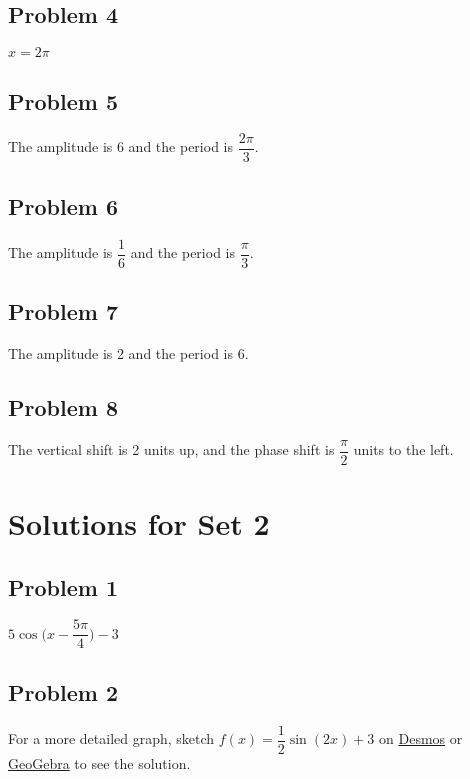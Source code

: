 \documentclass[12pt]{article}
\begin{document}
\subsection*{Problem 4}
\(x=2\pi\)
\subsection*{Problem 5}
The amplitude is 6 and the period is \(\dfrac{2\pi}{3}\).
\subsection*{Problem 6}
The amplitude is \(\dfrac{1}{6}\) and the period is \(\dfrac{\pi}{3}\).
\subsection*{Problem 7}
The amplitude is 2 and the period is 6.
\subsection*{Problem 8}
The vertical shift is 2 units up, and the phase shift is \(\dfrac{\pi}{2}\) units to the left.

\section*{Solutions for Set 2}
\subsection*{Problem 1}
\(5\cos\Big(x-\dfrac{5\pi}{4}\Big)-3\)
\subsection*{Problem 2}
\begin{center}
\end{center}

For a more detailed graph, sketch \(f(x)=\dfrac{1}{2}\sin(2x)+3\) on \href{https://www.desmos.com/calculator}{Desmos} or \href{https://www.geogebra.org/graphing?lang=en}{GeoGebra} to see the solution.
\end{document}
